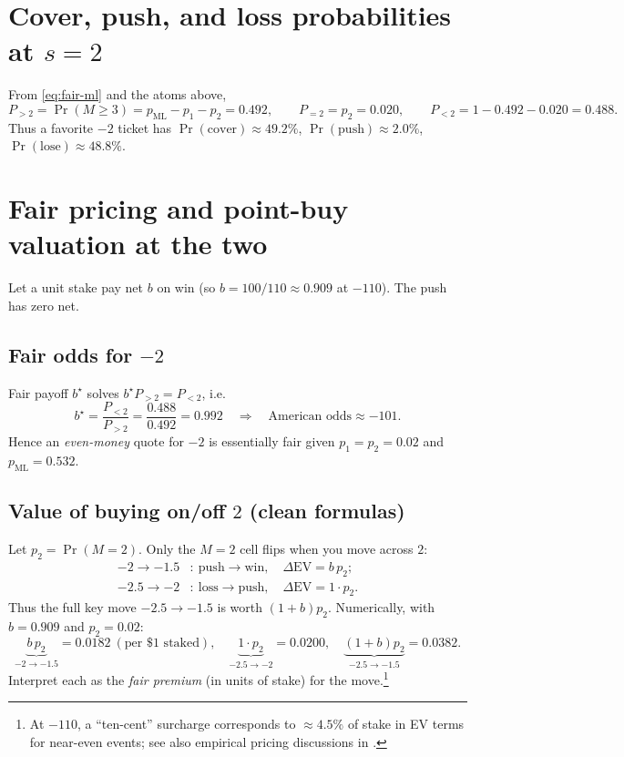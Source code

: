 \documentclass[11pt]{amsart}
\begin{document}
\section{Cover, push, and loss probabilities at $s=2$}
From \eqref{eq:fair-ml} and the atoms above,
\[
P_{>2}=\Pr(M\ge 3)=p_{\mathrm{ML}}-p_1-p_2=0.492,\qquad P_{=2}=p_2=0.020,\qquad P_{<2}=1-0.492-0.020=0.488.
\]
Thus a favorite $-2$ ticket has $\Pr(\text{cover})\approx 49.2\%$, $\Pr(\text{push})\approx2.0\%$, $\Pr(\text{lose})\approx48.8\%$.

\section{Fair pricing and point-buy valuation at the two}
Let a unit stake pay net $b$ on win (so $b=100/110\approx 0.909$ at $-110$). The push has zero net.

\subsection*{Fair odds for $-2$}
Fair payoff $b^\star$ solves $b^\star P_{>2}=P_{<2}$, i.e.
\[
b^\star=\frac{P_{<2}}{P_{>2}}=\frac{0.488}{0.492}=0.992\quad\Longrightarrow\quad \text{American odds} \approx -101.
\]
Hence an \emph{even-money} quote for $-2$ is essentially fair given $p_1=p_2=0.02$ and $p_{\mathrm{ML}}=0.532$.

\subsection*{Value of buying on/off $2$ (clean formulas)}
Let $p_2=\Pr(M=2)$. Only the $M=2$ cell flips when you move across $2$:
\begin{align*}
-2 \to -1.5&:\ \text{push}\to\text{win},\quad \Delta \text{EV}=b\,p_2;\\
-2.5 \to -2&:\ \text{loss}\to\text{push},\quad \Delta \text{EV}=1\cdot p_2.
\end{align*}
Thus the full key move $-2.5\to -1.5$ is worth $(1+b)p_2$. Numerically, with $b=0.909$ and $p_2=0.02$:
\[
\underbrace{b\,p_2}_{-2\to-1.5}\!=\!0.0182\ (\text{per \$1 staked}),\quad 
\underbrace{1\cdot p_2}_{-2.5\to-2}\!=\!0.0200,\quad 
\underbrace{(1{+}b)p_2}_{-2.5\to-1.5}\!=\!0.0382.
\]
Interpret each as the \emph{fair premium} (in units of stake) for the move.\footnote{At $-110$, a ``ten-cent'' surcharge corresponds to $\approx 4.5\%$ of stake in EV terms for near-even events; see also empirical pricing discussions in \cite{Boyds-KeyNumbers,Inpredictable-Distribution}.}
\end{document}
